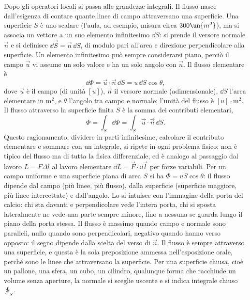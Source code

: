\documentclass[main.tex]{subfiles}
\begin{document}
Dopo gli operatori locali si passa alle grandezze integrali. Il flusso nasce dall'esigenza di contare quante linee di campo attraversano una superficie. Una superficie $S$ è uno scalare (l'aula, ad esempio, misura circa $300\un{m^2}$), ma si associa un vettore a un suo elemento infinitesimo $\dd S$: si prende il versore normale $\vec n$ e si definisce $\dd\vec S=\vec n\,\dd S$, di modulo pari all'area e direzione perpendicolare alla superficie. Un elemento infinitesimo può sempre considerarsi piano, perciò il campo $\vec u$ vi assume un solo valore e ha un solo angolo con $\vec n$. Il flusso elementare è
\[
\dd\Phi=\vec u\cdot\vec n\,\dd S=u\,\dd S\cos\theta ,
\]
dove $\vec u$ è il campo (di unità $[u]$), $\vec n$ il versore normale (adimensionale), $\dd S$ l'area elementare in $\mathrm{m^2}$, e $\theta$ l'angolo tra campo e normale; l'unità del flusso è $[u]\cdot\mathrm{m^2}$. Il flusso attraverso la superficie finita $S$ è la somma dei contributi elementari,
\[
\Phi=\int_S\dd\Phi=\int_S\vec u\cdot\vec n\,\dd S .
\]
Questo ragionamento, dividere in parti infinitesime, calcolare il contributo elementare e sommare con un integrale, si ripete in ogni problema fisico: non è tipico del flusso ma di tutta la fisica differenziale, ed è analogo al passaggio dal lavoro $L=F\Delta{l}$ al lavoro elementare $\dd L=\vec F\cdot\dd\vec l$ per forze variabili. Per un campo uniforme e una superficie piana di area $S$ si ha $\Phi=uS\cos\theta$: il flusso dipende dal campo (più linee, più flusso), dalla superficie (superficie maggiore, più linee intercettate) e dall'angolo. Lo si intuisce con l'immagine della porta del calcio: chi sta davanti e perpendicolare vede l'intera porta, chi si sposta lateralmente ne vede una parte sempre minore, fino a nessuna se guarda lungo il piano della porta stessa. Il flusso è massimo quando campo e normale sono paralleli, nullo quando sono perpendicolari, negativo quando hanno verso opposto: il segno dipende dalla scelta del verso di $\vec n$. Il flusso è sempre attraverso una superficie, e questa è la sola preposizione ammessa nell'esposizione orale, perché sono le linee che attraversano la superficie. Per una superficie chiusa, cioè un pallone, una sfera, un cubo, un cilindro, qualunque forma che racchiude un volume senza aperture, la normale si sceglie uscente e si indica integrale chiuso  $\oint_S$.
\end{document}
